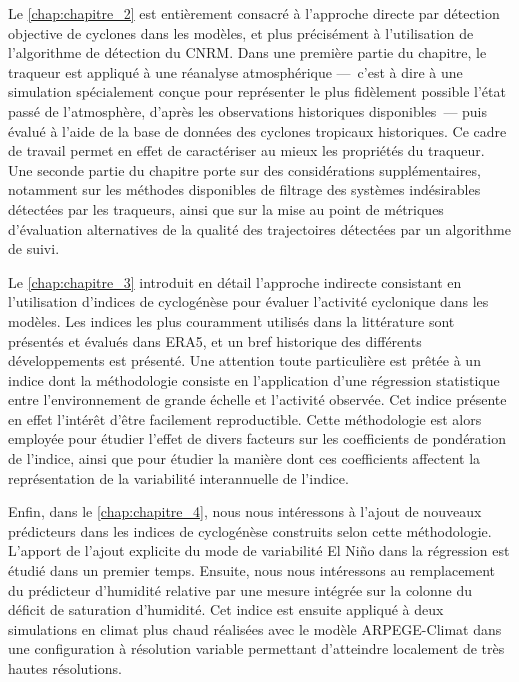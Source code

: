 \documentclass[../main.tex]{subfiles}
\begin{document}
Le \cref{chap:chapitre_2} est entièrement consacré à l'approche directe par détection objective de cyclones dans les modèles, et plus précisément à
l'utilisation de l'algorithme de détection du CNRM. Dans une première partie du chapitre, le traqueur est appliqué à une réanalyse atmosphérique ---~c'est à dire
à une simulation spécialement conçue pour représenter le plus fidèlement possible l'état passé de l'atmosphère, d'après les observations historiques
disponibles~--- puis évalué à l'aide de la base de données des cyclones tropicaux historiques. Ce cadre de travail permet en effet de caractériser au mieux les
propriétés du traqueur. Une seconde partie du chapitre porte sur des considérations supplémentaires, notamment sur les méthodes disponibles de filtrage des
systèmes indésirables détectées par les traqueurs, ainsi que sur la mise au point de métriques d'évaluation alternatives de la qualité des trajectoires
détectées par un algorithme de suivi.

Le \cref{chap:chapitre_3} introduit en détail l’approche indirecte consistant en l’utilisation d’indices de cyclogénèse pour évaluer l’activité cyclonique dans les
modèles. Les indices les plus couramment utilisés dans la littérature sont présentés et évalués dans ERA5, et un bref historique des différents développements est présenté. Une attention
toute particulière est prêtée à un indice dont la méthodologie consiste en l'application d'une régression statistique entre l'environnement de grande échelle et l'activité observée. Cet indice présente en effet l'intérêt d'être facilement reproductible. Cette méthodologie est alors employée pour étudier l'effet de divers facteurs sur les coefficients de pondération de l'indice, ainsi que pour étudier la manière dont ces coefficients affectent la représentation de la variabilité interannuelle de l'indice.

Enfin, dans le \cref{chap:chapitre_4}, nous nous intéressons à l’ajout de nouveaux prédicteurs dans les indices de cyclogénèse construits selon cette
méthodologie. L’apport de l’ajout explicite du mode de variabilité El Niño dans la régression est étudié dans un premier temps. Ensuite, nous nous intéressons
au remplacement du prédicteur d'humidité relative par une mesure intégrée sur la colonne du déficit de saturation d’humidité. Cet indice est ensuite appliqué à
deux simulations en climat plus chaud réalisées avec le modèle ARPEGE-Climat dans une configuration à résolution variable permettant d'atteindre localement de
très hautes résolutions.
\end{document}
